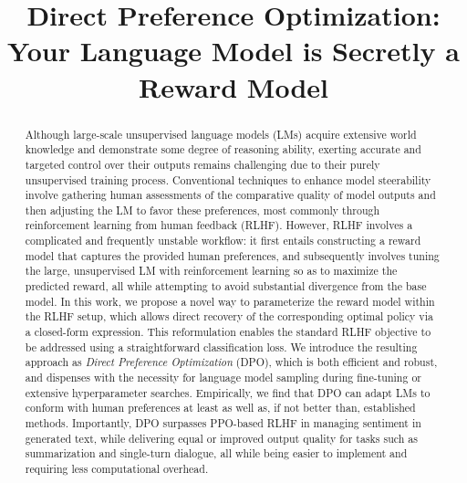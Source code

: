 \title{Direct Preference Optimization: Your Language Model is Secretly a Reward Model}

\begin{abstract}
Although large-scale unsupervised language models (LMs) acquire extensive world knowledge and demonstrate some degree of reasoning ability, exerting accurate and targeted control over their outputs remains challenging due to their purely unsupervised training process. Conventional techniques to enhance model steerability involve gathering human assessments of the comparative quality of model outputs and then adjusting the LM to favor these preferences, most commonly through reinforcement learning from human feedback (RLHF). However, RLHF involves a complicated and frequently unstable workflow: it first entails constructing a reward model that captures the provided human preferences, and subsequently involves tuning the large, unsupervised LM with reinforcement learning so as to maximize the predicted reward, all while attempting to avoid substantial divergence from the base model. In this work, we propose a novel way to parameterize the reward model within the RLHF setup, which allows direct recovery of the corresponding optimal policy via a closed-form expression. This reformulation enables the standard RLHF objective to be addressed using a straightforward classification loss. We introduce the resulting approach as \textit{Direct Preference Optimization} (DPO), which is both efficient and robust, and dispenses with the necessity for language model sampling during fine-tuning or extensive hyperparameter searches. Empirically, we find that DPO can adapt LMs to conform with human preferences at least as well as, if not better than, established methods. Importantly, DPO surpasses PPO-based RLHF in managing sentiment in generated text, while delivering equal or improved output quality for tasks such as summarization and single-turn dialogue, all while being easier to implement and requiring less computational overhead.
\end{abstract}

